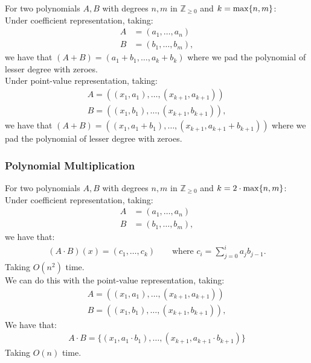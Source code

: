 For two polynomials $A, B$ with degrees $n, m$ in $\mathbb{Z}_{\geq 0}$
and $k = \operatorname{max}\{n, m\}$:
\\[\baselineskip]
Under coefficient representation, taking: \begin{align*}
    A &= (a_1, \ldots, a_n) \\
    B &= (b_1, \ldots, b_m),
\end{align*} we have that $(A + B) = (a_1 + b_1, \ldots, a_k + b_k)$
where we pad the polynomial of lesser degree with zeroes.
\\[\baselineskip]
Under point-value representation, taking: \begin{align*}
    A = ((x_1, a_1), \ldots, (x_{k + 1}, a_{k + 1})) \\
    B = ((x_1, b_1), \ldots, (x_{k + 1}, b_{k + 1})),
\end{align*} we have that $(A + B) = ((x_1, a_1 + b_1), 
\ldots, (x_{k + 1}, a_{k + 1} + b_{k + 1}))$ where we pad the polynomial 
of lesser degree with zeroes.

\subsubsection{Polynomial Multiplication}

For two polynomials $A, B$ with degrees $n, m$ in $\mathbb{Z}_{\geq 0}$
and $k = 2 \cdot \operatorname{max}\{n, m\}$:
\\[\baselineskip]
Under coefficient representation, taking: \begin{align*}
    A &= (a_1, \ldots, a_n) \\
    B &= (b_1, \ldots, b_m),
\end{align*} we have that: \begin{gather*}
  (A \cdot B)(x) = (c_1, \ldots, c_k) \qquad \text{where }
  c_i = \sum_{j = 0}^ia_jb_{j - 1}.
\end{gather*} Taking $O(n^2)$ time.
\\[\baselineskip]
We can do this with the point-value representation, taking: \begin{align*}
    A = ((x_1, a_1), \ldots, (x_{k + 1}, a_{k + 1})) \\
    B = ((x_1, b_1), \ldots, (x_{k + 1}, b_{k + 1})),
\end{align*} We have that: \begin{gather*}
  A \cdot B = \{(x_1, a_1 \cdot b_1), \ldots, (x_{k + 1}, a_{k + 1} \cdot b_{k + 1})\}
\end{gather*} Taking $O(n)$ time.

